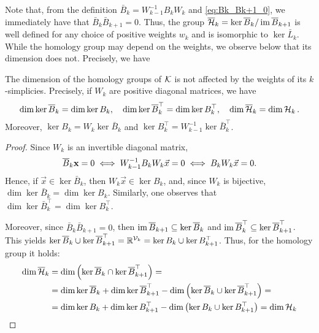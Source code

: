 Note that, from the definition \( \bar B_k= W_{k-1}^{-1} B_k W_k \) and \eqref{eq:Bk_Bk+1_0}, we immediately have that  \( \bar B_k\bar B_{k+1}=0 \). Thus, the group \( \overline{\mathcal{H}}_k = \ker \overline{B}_k / \operatorname{im} \overline{B}_{k+1} \) is well defined for any choice of positive weights  \( w_k \) and is isomorphic to \( \ker \bar L_k \). While the homology group may depend on the weights,  we observe below that its dimension does not. Precisely, we have 
\begin{proposition}
 \label{thm:wHomGroup}
     The dimension of the homology groups of \( \mathcal{K} \) is not affected by the weights of its \( k \)-simplicies. Precisely, if \( W_k \) are positive diagonal matrices, we have
     \begin{equation}
         \dim \ker \overline{B}_k = \dim \ker B_k, \quad \dim \ker \overline{B}_k^\top = \dim \ker B_k^\top, \quad \dim \overline{\mathcal{H}}_k = \dim \mathcal{H}_k\, .
     \end{equation}
     Moreover, \( \ker B_k = W_k \ker \bar B_k \) and \( \ker B_k^\top = W_{k-1}^{-1} \ker \bar B_k^\top \).
\end{proposition}

\begin{proof}
Since \( W_k \) is an invertible diagonal matrix, 
\begin{equation*}
    \overline{B}_k \mathbf{x} = 0 \iff W_{k-1}^{-1}B_k W_k \vec x =0 \iff B_k W_k \vec x =0. 
\end{equation*}
Hence, if \( \vec x \in \ker \bar B_k \), then \( W_k \vec x \in \ker B_k \), and, since \( W_k \) is bijective, \( \dim \ker \bar B_k = \dim \ker B_k \). Similarly, one observes that \( \dim \ker \bar B_k^\top = \dim \ker B_k^\top \).

Moreover, since \( \bar B_k \bar B_{k+1} =0 \), then \( \operatorname{im} \overline{B}_{k+1} \subseteq \ker \overline{B}_k \) and \( \operatorname{im} \overline{B}_k^\top \subseteq \ker \overline{B}_{k+1}^\top \). This yields \( \ker \overline{B}_k \cup \ker \overline{B}_{k+1}^\top = \mathbb{R}^{\mathcal{V}_k} = \ker B_k \cup \ker  B_{k+1}^\top\). Thus, for the homology group it holds:
\begin{equation*}
      \begin{aligned}
    \dim \overline{\mathcal{H}}_k & = \dim \left( \ker \overline{B}_k \cap \ker \overline{B}_{k+1}^\top \right)= \\
    & = \dim \ker \overline{B}_k + \dim \ker \overline{B}_{k+1}^\top - \dim \left( \ker \overline{B}_k \cup \ker \overline{B}_{k+1}^\top \right) = \\
    & = \dim \ker B_k + \dim \ker  B_{k+1}^\top - \dim \left( \ker  B_k \cup \ker  B_{k+1}^\top \right) = \dim \mathcal{H}_k
      \end{aligned}
\end{equation*}
\end{proof}
